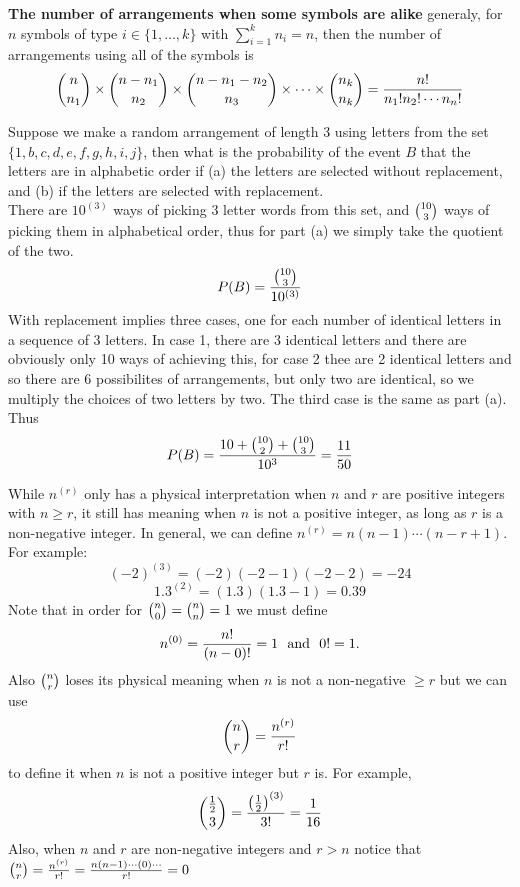 \documentclass[english, 11pt]{article}
\begin{document}
    \begin{rem}
      \textbf{The number of arrangements when some symbols are alike} generaly, for $n$ symbols of type $i \in \{1,\ldots,k\}$ with $\sum_{i=1}^k n_i = n$, then the number of arrangements using all of the symbols is
    \[ {n \choose n_1}\times{n-n_1 \choose n_2} \times {n-n_1-n_2 \choose n_3}\times\cdots\times{n_k \choose n_k} = \frac{n!}{n_1!n_2!\cdots n_n!} \]
    \end{rem}

  \begin{exmp}
    Suppose we make a random arrangement of length 3 using letters from the set $\{ 1,b,c,d,e,f,g,h,i,j \}$, then what is the probability of the event $B$ that the letters are in alphabetic order if (a) the letters are selected without replacement, and (b) if the letters are selected with replacement. \\
    There are $10^{(3)}$ ways of picking 3 letter words from this set, and ${10 \choose 3}$ ways of picking them in alphabetical order, thus for part (a) we simply take the quotient of the two.
    \[ P(B) = \frac{{10 \choose 3}}{10^{(3)}} \]
    With replacement implies three cases, one for each number of identical letters in a sequence of 3 letters. In case 1, there are 3 identical letters and there are obviously only 10 ways of achieving this, for case 2 thee are 2 identical letters and so there are 6 possibilites of arrangements, but only two are identical, so we multiply the choices of two letters by two. The third case is the same as part (a). Thus
    \[ P(B) = \f{10+\comb{10}{2}\time2 + \comb{10}{3}}{10^3} = \f{11}{50} \]
  \end{exmp}

  \begin{note}
    While $n^{(r)}$ only has a physical interpretation when $n$ and $r$ are positive integers with $n \geq r$, it still has meaning when $n$ is not a positive integer, as long as $r$ is a non-negative integer. In general, we can define $n^{(r)} = n(n-1)\cdots(n-r+1).$ For example:
    \[ (-2)^{(3)} = (-2)(-2 -1)(-2 -2) = -24 \]
    \[ 1.3^{(2)} = (1.3)(1.3 - 1) = 0.39 \]
    Note that in order for ${n \choose 0} = {n \choose n} =1$ we must define
    \[ n^{(0)} = \frac{n!}{(n-0)!} = 1 \mbox{ \ and \ } 0! = 1. \]
    Also ${n \choose r}$ loses its physical meaning when $n$ is not a non-negative $\geq r$ but we can use
    \[ {n \choose r} = \frac{n^{(r)}}{r!} \]
    to define it when $n$ is not a positive integer but $r$ is. For example,
    \[ {\frac{1}{2} \choose 3} = \frac{\left(\frac{1}{2}\right)^{(3)}}{3!} = \frac{1}{16} \]
    Also, when $n$ and $r$ are non-negative integers and $r > n$ notice that ${n \choose r} = \frac{n^{(r)}}{r!} = \frac{n(n-1)\cdots(0)\cdots}{r!} = 0$
  \end{note}
\end{document}
